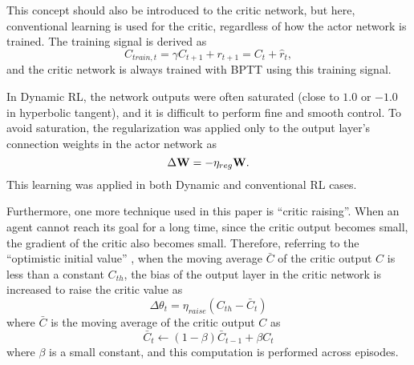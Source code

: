 This concept should also be introduced to the critic network,
but here, conventional learning is used for the critic, regardless of how the actor network is trained.
The training signal is derived as
\begin{equation}
C_{train,t} = \gamma C_{t+1} + r_{t+1} = C_t + \hat{r}_t,
\label{Eq:C_train}
\end{equation}
and the critic network is always trained with BPTT using this training signal.

In Dynamic RL, the network outputs were often saturated (close to $1.0$ or $-1.0$ in hyperbolic tangent),
and it is difficult to perform fine and smooth control.
To avoid saturation, the regularization was applied only to the output layer's connection weights in the actor network as
\begin{equation}
  \Delta {\bf W} = -\eta_{reg} {\bf W}.
  \label{Eq:Regularize}
\end{equation} 
This learning was applied in both Dynamic and conventional RL cases.
 
Furthermore, one more technique used in this paper is ``critic raising''.
When an agent cannot reach its goal for a long time,
since the critic output becomes small, the gradient of the critic also becomes small.
Therefore, referring to the ``optimistic initial value'' \citep{Sutton1998},
when the moving average $\bar{C}$ of the critic output $C$ is less than a constant $C_{th}$,
the bias of the output layer in the critic network is increased to raise the critic value as
\begin{equation}
  \Delta \theta_t = \eta_{raise} (C_{th}-\bar{C}_t)
  \label{Eq:Raise_Critic}
\end{equation} 
where $\bar{C}$ is the moving average of the critic output $C$ as 
\begin{equation}
 \bar{C}_t \leftarrow (1-\beta) \bar{C}_{t-1}  + \beta C_t
 \label{Eq:Ave_C}
\end{equation}
where $\beta$ is a small constant, and this computation is performed across episodes.

